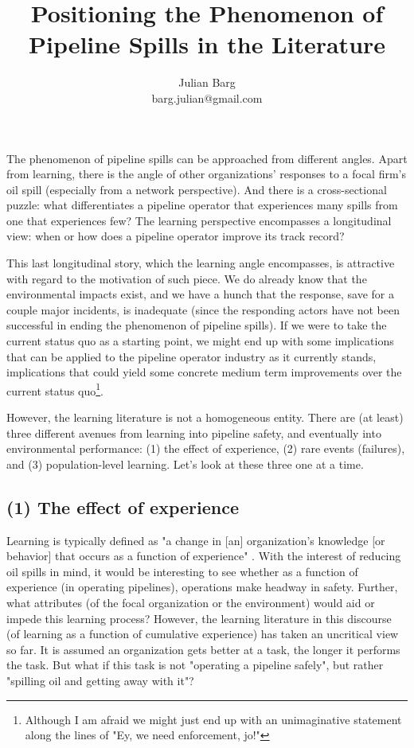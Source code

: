 \documentclass[12pt, man, natbib]{apa6}
\title{Positioning the Phenomenon of Pipeline Spills in the Literature}
\author{Julian Barg\\barg.julian@gmail.com}
\affiliation{Ivey Business School}
\begin{document}
	
	\maketitle
	
	\singlespacing
	
	\section{}	
	
	The phenomenon of pipeline spills can be approached from different angles. Apart from learning, there is the angle of other organizations' responses to a focal firm's oil spill (especially from a network perspective). And there is a cross-sectional puzzle: what differentiates a pipeline operator that experiences many spills from one that experiences few? The learning perspective encompasses a longitudinal view: when or how does a pipeline operator improve its track record? 
	
	This last longitudinal story, which the learning angle encompasses, is attractive with regard to the motivation of such piece. We do already know that the environmental impacts exist, and we have a hunch that the response, save for a couple major incidents, is inadequate (since the responding actors have not been successful in ending the phenomenon of pipeline spills). If we were to take the current status quo as a starting point, we might end up with some implications that can be applied to the pipeline operator industry as it currently stands, implications that could yield some concrete medium term improvements over the current status quo\footnote{Although I am afraid we might just end up with an unimaginative statement along the lines of "Ey, we need enforcement, jo!"}.
	
	However, the learning literature is not a homogeneous entity. There are (at least) three different avenues from learning into pipeline safety, and eventually into environmental performance: (1) the effect of experience, (2) rare events (failures), and (3) population-level learning. Let's look at these three one at a time.
	
	\subsection{(1) The effect of experience}
	
	Learning is typically defined as "a change in [an] organization's knowledge [or behavior] that occurs as a function of experience" \citep[31]{Argote2013b}. With the interest of reducing oil spills in mind, it would be interesting to see whether as a function of experience (in operating pipelines), operations make headway in safety. Further, what attributes (of the focal organization or the environment) would aid or impede this learning process? However, the learning literature in this discourse (of learning as a function of cumulative experience) has taken an uncritical view so far. It is assumed an organization gets better at a task, the longer it performs the task. But what if this task is not "operating a pipeline safely", but rather "spilling oil and getting away with it"?
	
\end{document}

